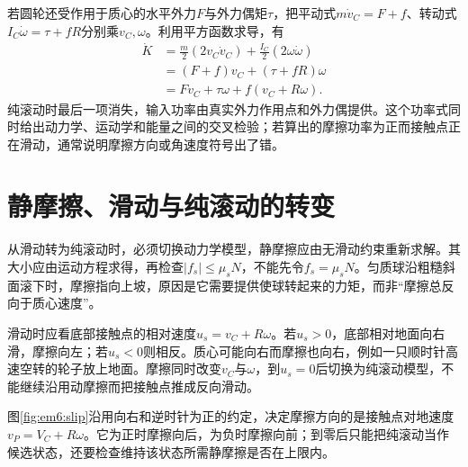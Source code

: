 若圆轮还受作用于质心的水平外力$F$与外力偶矩$\tau$，把平动式$m\dot v_C=F+f$、转动式$I_C\dot\omega=\tau+fR$分别乘$v_C,\omega$。利用平方函数求导，有
\[
 \begin{aligned}
 \dot K&=\frac m2(2v_C\dot v_C)+\frac{I_C}{2}(2\omega\dot\omega)\\
 &=(F+f)v_C+(\tau+fR)\omega\\
 &=Fv_C+\tau\omega+f(v_C+R\omega).
 \end{aligned}
\]
纯滚动时最后一项消失，输入功率由真实外力作用点和外力偶提供。这个功率式同时给出动力学、运动学和能量之间的交叉检验；若算出的摩擦功率为正而接触点正在滑动，通常说明摩擦方向或角速度符号出了错。



\section{静摩擦、滑动与纯滚动的转变}

从滑动转为纯滚动时，必须切换动力学模型，静摩擦应由无滑动约束重新求解。其大小应由运动方程求得，再检查$|f_s|\le\mu_sN$，不能先令$f_s=\mu_sN$。匀质球沿粗糙斜面滚下时，摩擦指向上坡，原因是它需要提供使球转起来的力矩，而非“摩擦总反向于质心速度”。

滑动时应看底部接触点的相对速度$u_s=v_C+R\omega$。若$u_s>0$，底部相对地面向右滑，摩擦向左；若$u_s<0$则相反。质心可能向右而摩擦也向右，例如一只顺时针高速空转的轮子放上地面。摩擦同时改变$v_C$与$\omega$，到$u_s=0$后切换为纯滚动模型，不能继续沿用动摩擦而把接触点推成反向滑动。


图\ref{fig:em6:slip}沿用向右和逆时针为正的约定，决定摩擦方向的是接触点对地速度$v_P=V_C+R\omega$。它为正时摩擦向后，为负时摩擦向前；到零后只能把纯滚动当作候选状态，还要检查维持该状态所需静摩擦是否在上限内。



